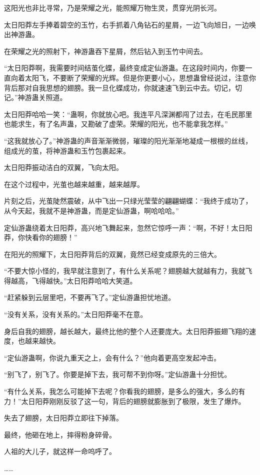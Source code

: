 \begin{this_body}
这阳光也非比寻常，乃是荣耀之光，能照耀万物生灵，贯穿光阴长河。

太日阳莽左手捧着碧空的玉竹，右手抓着八角钻石的星屑，一边飞向旭日，一边唤出神游蛊。

在荣耀之光的照射下，神游蛊吞下星屑，然后钻入到玉竹中间去。

“太日阳莽啊，我需要时间结茧化蝶，最终变成定仙游蛊。在这段时间内，你要一直向着太阳飞，不要断了荣耀的光辉。但是你更要小心，思想蛊曾经说过，注意你背后那对自我思想的翅膀。我一旦化蝶成功，你就速速飞到云中去。切记，切记。”神游蛊关照道。

太日阳莽哈哈一笑：“蛊啊，你就放心吧。我连平凡深渊都闯了过去，在毛民那里也能求生，有了名声蛊，又勘破了虚荣。荣耀的阳光，也不能拿我怎样。”

“这我就放心了。”神游蛊的声音渐渐微弱，璀璨的阳光渐渐地凝成一根根的丝线，组成光的茧，将神游蛊和玉竹包裹起来。

太日阳莽振动洁白的双翼，飞向太阳。

在这个过程中，光茧也越来越重，越来越厚。

片刻之后，光茧陡然震破，从中飞出一只绿光莹莹的翩翩蝴蝶：“我终于成功了，从今天起，我就不是神游蛊，而是定仙游蛊，啊哈哈哈。”

定仙游蛊绕着太日阳莽，高兴地飞舞起来，忽然它惊呼一声：“啊，不好！太日阳莽，你快看你的翅膀！”

在阳光的照耀下，太日阳莽背后的双翼，竟然已经变成原先的三倍大。

“不要大惊小怪的，我早就注意到了，有什么关系呢？翅膀越大就越有力，我就飞得越高，飞得越快。”太日阳莽哈哈大笑道。

“赶紧躲到云层里吧，不要再飞了。”定仙游蛊担忧地道。

“没有关系，没有关系的。”太日阳莽毫不在意。

身后自我的翅膀，越长越大，最终比他的整个人还要庞大。太日阳莽振翅飞翔的速度，也越来越快。

“定仙游蛊啊，你说九重天之上，会有什么？”他向着更高空发起冲击。

“别飞了，别飞了。你要是掉下去，我可帮不到你呀。”定仙游蛊十分担忧。

“有什么关系，我怎么可能掉下去呢？你看我的翅膀，是多么的强大，多么的有力！”太日阳莽刚刚反驳了这一句，背后的翅膀就膨胀到了极限，发生了爆炸。

失去了翅膀，太日阳莽立即往下掉落。

最终，他砸在地上，摔得粉身碎骨。

人祖的大儿子，就这样一命呜呼了。

……


\end{this_body}
